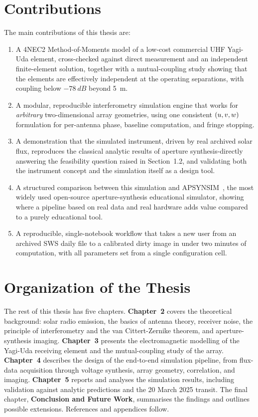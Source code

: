 \section{Contributions}
\label{sec:contributions-intro}
The main contributions of this thesis are:
\begin{enumerate}[leftmargin=1.8em]
  \item A 4NEC2 Method-of-Moments model of a low-cost commercial UHF Yagi-Uda
        element, cross-checked against direct measurement and an independent
        finite-element solution, together with a mutual-coupling study
        showing that the elements are effectively independent at the
        operating separations, with coupling below $-78~\si{dB}$ beyond
        \SI{5}{\metre}.
  \item A modular, reproducible interferometry simulation engine that works
        for \emph{arbitrary} two-dimensional array geometries, using one
        consistent $(u,v,w)$ formulation for per-antenna phase, baseline
        computation, and fringe stopping.
  \item A demonstration that the simulated instrument, driven by real
        archived solar flux, reproduces the classical analytic results of
        aperture synthesis-directly answering the feasibility question
        raised in Section~1.2, and validating both the instrument concept
        and the simulation itself as a design tool.
  \item A structured comparison between this simulation and
        \textsc{APSYNSIM}~\citep{apsynsim}, the most widely used open-source
        aperture-synthesis educational simulator, showing where a pipeline
        based on real data and real hardware adds value compared to a purely
        educational tool.
  \item A reproducible, single-notebook workflow that takes a new user from
        an archived SWS daily file to a calibrated dirty image in under two
        minutes of computation, with all parameters set from a single
        configuration cell.
\end{enumerate}

\section{Organization of the Thesis}
The rest of this thesis has five chapters.
\textbf{Chapter~2} covers the theoretical background: solar radio emission,
the basics of antenna theory, receiver noise, the principle of interferometry
and the van Cittert-Zernike theorem, and aperture-synthesis imaging.
\textbf{Chapter~3} presents the electromagnetic modelling of the Yagi-Uda
receiving element and the mutual-coupling study of the array.
\textbf{Chapter~4} describes the design of the end-to-end simulation
pipeline, from flux-data acquisition through voltage synthesis, array
geometry, correlation, and imaging.
\textbf{Chapter~5} reports and analyses the simulation results, including
validation against analytic predictions and the 20 March 2025 transit.
The final chapter, \textbf{Conclusion and Future Work}, summarises the
findings and outlines possible extensions. References and appendices follow.
\clearpage
